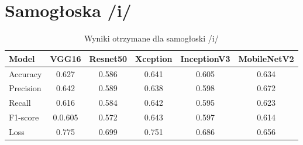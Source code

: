 \section{Samogłoska /i/}
\label{sec:samogloska-i}

\begin{table}[h]
\centering
\caption{Wyniki otrzymane dla samogłoski /i/}
\label{tab:wyniki-i}
\begin{tabular}{|l|c|c|c|c|c|}
\hline
\textbf{Model} &\textbf{VGG16} &\textbf{Resnet50} &\textbf{Xception} &\textbf{InceptionV3} &\textbf{MobileNetV2} \\ \hline
    Accuracy &0.627 &0.586 &0.641 &0.605 &0.634 \\ \hline
    Precision &0.642 &0.589 &0.638 &0.598 &0.672 \\ \hline
    Recall &0.616 &0.584 &0.642 &0.595  &0.623 \\ \hline
    F1-score &0.0.605 &0.572 &0.643 &0.597 &0.614 \\ \hline
    Loss &0.775 &0.699 &0.751 &0.686 &0.656 \\ \hline
\end{tabular}
\end{table}

